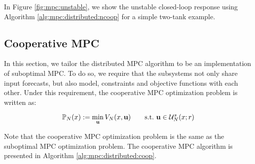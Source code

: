 In Figure \ref{fig:mpc:unstable}, we show the unstable closed-loop response using Algorithm
\ref{alg:mpc:distributed:ncoop} for a simple two-tank example.

\subsection{Cooperative MPC}
\label{sec:mpc:distributed:coop}
In this section, we tailor the distributed MPC algorithm to be an
implementation of suboptimal MPC. To do so, we require that the
subsystems not only share input forecasts, but also model, constraints
and objective functions with each other. Under this requirement, the
cooperative MPC optimization problem is written as:

\begin{equation}
\label{eq:mpc:distributed:coopPNx}
\mathbb{P}_N(x) := \min_{\mathbf{u}}{V_N(x,\mathbf{u})} \qquad \text{s.t.~} \mathbf{u}
\in \mathcal{U}^s_N(x;r)
\end{equation}

Note that the cooperative MPC optimization problem is the same as the
suboptimal MPC optimization problem. The cooperative MPC algorithm is
presented in Algorithm \ref{alg:mpc:distributed:coop}.


